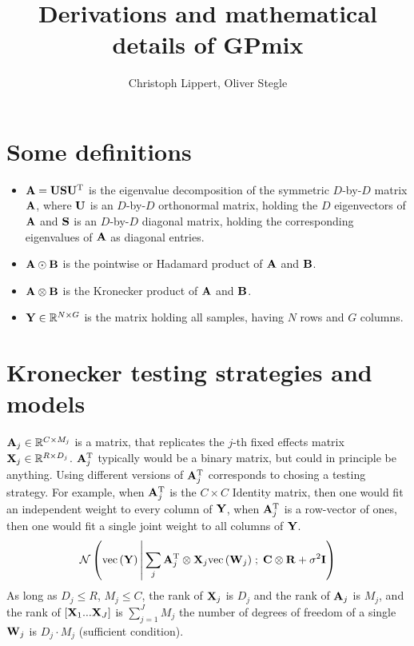 \documentclass{article}
\title{Derivations and mathematical details of GPmix}
\author[1]{Christoph Lippert, Oliver Stegle}
\affil[1]{Department Empirical Inference,
Max Planck Institutes T\"ubingen, Germany}
\date{}
\newcommand{\B}[1]{{\bf{#1}}}
\newcommand\Normal[3]{\normal{#1}{{#2}\;;\;{#3}}}
\newcommand\ve[1]{\text{vec}\left(#1\right)}
\newcommand\Real{\mathbb{R}}
\begin{document}
\maketitle


\section{Some definitions}
\begin{itemize}
\item $\B{A}=\B{U}\B{S}\B{U}^{\T}$ is the eigenvalue decomposition of
  the symmetric $D$-by-$D$ matrix $\B{A}$, where $\B{U}$ is an
  $D$-by-$D$ orthonormal matrix, holding the $D$ eigenvectors of
  $\B{A}$ and $\B{S}$ is an $D$-by-$D$ diagonal matrix, holding the
  corresponding eigenvalues of $\B{A}$ as diagonal entries. 
\item $\B{A}\odot\B{B}$ is the pointwise or Hadamard product of $\B{A}$ and $\B{B}$.
\item $\B{A}\otimes\B{B}$ is the Kronecker product of $\B{A}$ and $\B{B}$.
\item $\B{Y}\in\mathbb{R}^{N\times G}$ is the matrix holding all samples, having $N$ rows and $G$ columns.
\end{itemize}


\section{Kronecker testing strategies and models}
$\B{A}_j\in\Real^{C\times M_j}$ is a matrix, that replicates the
$j$-th fixed effects matrix $\B{X}_j\in\Real^{R\times D_j}$. $\B{A}_j^\T$
typically would be a binary matrix, but could in principle be
anything. Using different versions of $\B{A}_j^\T$ corresponds to chosing
a testing strategy. For example, when $\B{A}_j^\T$ is the $C\times C$
Identity matrix, then one would fit an independent weight to every
column of $\B{Y}$, when $\B{A}^\T_j$ is a row-vector of ones, then one
would fit a single joint weight to all columns of $\B{Y}$.
\begin{equation}
\Normal{\ve{\B{Y}}}{\sum_j\B{A}^{\T}_j\otimes\B{X}_j\ve{\B{W}_j}}{\B{C}\otimes\B{R}
+ \sigma^2\B{I}}
\end{equation}
As long as $D_j\leq R$, $M_j\leq C$, the rank of $\B{X}_j$ is $D_j$
and the rank of $\B{A}_j$ is $M_j$, and the rank of
$\left[\B{X}_1...\B{X}_J\right]$ is $\sum_{j=1}^JM_j$ the number of
degrees of freedom of a single $\B{W}_j$ is $D_j \cdot M_j$
(sufficient condition).
\end{document}
